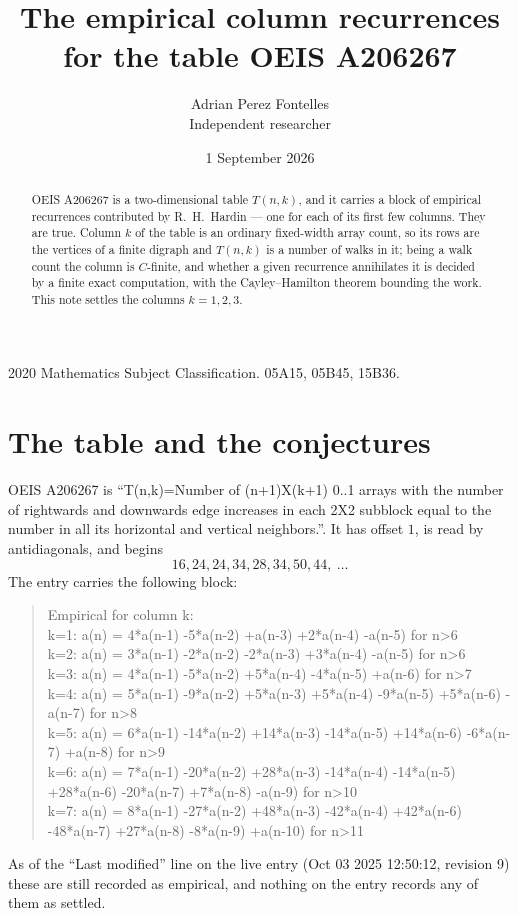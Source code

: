 \documentclass[11pt,a4paper]{article}
\title{The empirical column recurrences for the table OEIS A206267}
\author{Adrian Perez Fontelles\\ \small Independent researcher}
\date{1 September 2026}
\theoremstyle{plain}
\theoremstyle{definition}
\begin{document}
\maketitle

\begin{abstract}
OEIS A206267 is a two-dimensional table $T(n,k)$, and it carries a block of empirical
recurrences contributed by R.~H.~Hardin --- one for each of its first few columns. They are
true. Column $k$ of the table is an ordinary fixed-width array count, so its rows are the
vertices of a finite digraph and $T(n,k)$ is a number of walks in it; being a walk count the
column is $C$-finite, and whether a given recurrence annihilates it is decided by a finite
exact computation, with the Cayley--Hamilton theorem bounding the work. This note settles the columns $k=1, 2, 3$.
\end{abstract}

\noindent\small 2020 Mathematics Subject Classification. 05A15, 05B45, 15B36.\normalsize

\section{The table and the conjectures}

OEIS A206267 is ``T(n,k)=Number of (n+1)X(k+1) 0..1 arrays with the number of rightwards and downwards edge increases in each 2X2 subblock equal to the number in all its horizontal and vertical neighbors.''. It has offset $1$, is
read by antidiagonals, and begins
\[
16, 24, 24, 34, 28, 34, 50, 44,\ \dots
\]
The entry carries the following block:
\begin{quote}\small
Empirical for column k:\\
k=1: a(n) = 4*a(n-1) -5*a(n-2) +a(n-3) +2*a(n-4) -a(n-5) for n>6\\
k=2: a(n) = 3*a(n-1) -2*a(n-2) -2*a(n-3) +3*a(n-4) -a(n-5) for n>6\\
k=3: a(n) = 4*a(n-1) -5*a(n-2) +5*a(n-4) -4*a(n-5) +a(n-6) for n>7\\
k=4: a(n) = 5*a(n-1) -9*a(n-2) +5*a(n-3) +5*a(n-4) -9*a(n-5) +5*a(n-6) -a(n-7) for n>8\\
k=5: a(n) = 6*a(n-1) -14*a(n-2) +14*a(n-3) -14*a(n-5) +14*a(n-6) -6*a(n-7) +a(n-8) for n>9\\
k=6: a(n) = 7*a(n-1) -20*a(n-2) +28*a(n-3) -14*a(n-4) -14*a(n-5) +28*a(n-6) -20*a(n-7) +7*a(n-8) -a(n-9) for n>10\\
k=7: a(n) = 8*a(n-1) -27*a(n-2) +48*a(n-3) -42*a(n-4) +42*a(n-6) -48*a(n-7) +27*a(n-8) -8*a(n-9) +a(n-10) for n>11\\
\end{quote}
As of the ``Last modified'' line on the live entry (Oct 03 2025 12:50:12, revision 9) these are still
recorded as empirical, and nothing on the entry records any of them as settled.
\end{document}
